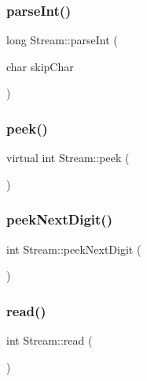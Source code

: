 \mbox{\label{class_stream_a4578615defade6c4ce7daeb6578bb62d}} 
\subsubsection{\texorpdfstring{parse\+Int()}{parseInt()}\hspace{0.1cm}{\footnotesize\ttfamily [2/2]}}
{\footnotesize\ttfamily long Stream\+::parse\+Int (\begin{DoxyParamCaption}\item[{char}]{skip\+Char }\end{DoxyParamCaption})\hspace{0.3cm}{\ttfamily [protected]}}

\mbox{\label{class_stream_a30c3c212ec6ea67277a708c5ea2501a5}} 
\subsubsection{\texorpdfstring{peek()}{peek()}}
{\footnotesize\ttfamily virtual int Stream\+::peek (\begin{DoxyParamCaption}{ }\end{DoxyParamCaption})\hspace{0.3cm}{\ttfamily [pure virtual]}}

\mbox{\label{class_stream_ab31c533ddc422c8d8df07986e5920534}} 
\subsubsection{\texorpdfstring{peek\+Next\+Digit()}{peekNextDigit()}}
{\footnotesize\ttfamily int Stream\+::peek\+Next\+Digit (\begin{DoxyParamCaption}{ }\end{DoxyParamCaption})\hspace{0.3cm}{\ttfamily [protected]}}

\mbox{\label{class_stream_a654017caec3e3feeba5feb346d83c7bb}} 
\subsubsection{\texorpdfstring{read()}{read()}\hspace{0.1cm}{\footnotesize\ttfamily [1/2]}}
{\footnotesize\ttfamily int Stream\+::read (\begin{DoxyParamCaption}{ }\end{DoxyParamCaption})\hspace{0.3cm}{\ttfamily [inline]}}



